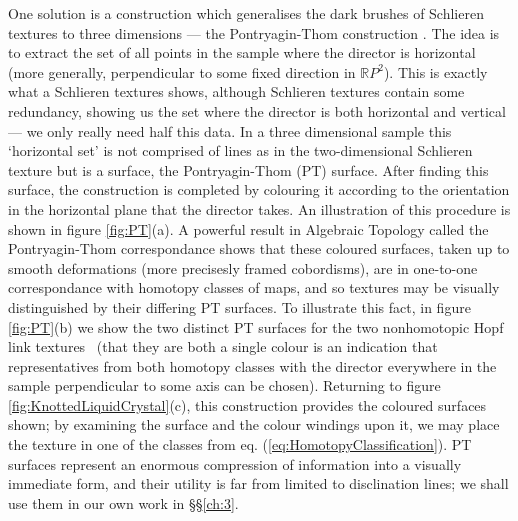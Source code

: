One solution is a construction which generalises the dark brushes of Schlieren textures to three dimensions --- the Pontryagin-Thom construction \citep{ChenThesis,AlexanderBook,MachonThesis,Chen2013}. The idea is to extract the set of all points in the sample where the director is horizontal (more generally, perpendicular to some fixed direction in $\mathbb{R}P^2$).  This is exactly what a Schlieren textures shows, although Schlieren textures contain some redundancy, showing us the set where the director is both horizontal and vertical ---  we only really need half this data. In a three dimensional sample this `horizontal set' is not comprised of lines as in the two-dimensional Schlieren texture but is a surface, the Pontryagin-Thom (PT) surface. After finding this surface, the construction is completed by colouring it according to the orientation in the horizontal plane that the director takes. An illustration of this procedure is shown in figure \ref{fig:PT}(a). A powerful result in Algebraic Topology called the Pontryagin-Thom correspondance \citep{Milnor1997,Hatcher2012} shows that these coloured surfaces, taken up to smooth deformations (more precisesly framed cobordisms), are in one-to-one correspondance with homotopy classes of maps, and so textures may be visually distinguished by their differing PT surfaces. To illustrate this fact, in figure \ref{fig:PT}(b) we show the two distinct  PT surfaces for the two nonhomotopic Hopf link textures~\citep{MachonThesis} (that they are both a single colour is an indication that representatives from both homotopy classes with the director everywhere in the sample perpendicular to some axis can be chosen). Returning to figure \ref{fig:KnottedLiquidCrystal}(c), this construction provides the coloured surfaces shown; by examining the surface and the colour windings upon it, we may place the texture in one of the classes from eq. (\ref{eq:HomotopyClassification}). PT surfaces represent an enormous compression of information into a visually immediate form, and their utility is far from limited to disclination lines; we shall use them in our own work in \S\S\ref{ch:3}.

